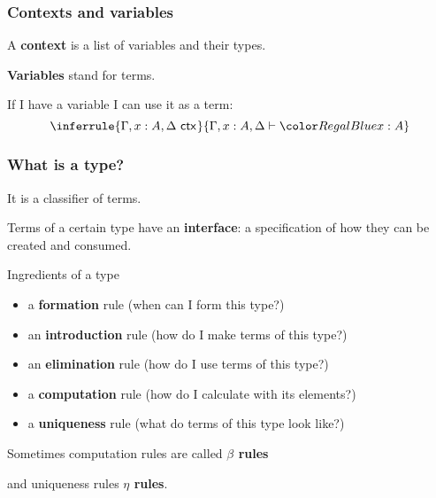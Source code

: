 \documentclass[handout]{beamer} %
\begin{document}
\begin{frame}
  \frametitle{Contexts and variables}
  A \textbf{context} is a list of variables and their types.
  
  \medskip

  \textbf{Variables} stand for terms.

  If I have a variable I can use it as a term:
  \[
    \inferrule{
      \IsCtx{\Gamma, x : A, \Delta}
    }{
      \IsTm[\Gamma, x : A, \Delta]{x}{A}
    }
  \]

\end{frame}

\begin{frame}
  \frametitle{What is a type?}
  
  It is a classifier of terms.

  \medskip
  
  Terms of a certain type have an \textbf{interface}: a specification of how
  they can be created and consumed.
  
  \medskip
  
  \begin{block}{Ingredients of a type}
    \begin{itemize}
      \item a \textbf{formation} rule (when can I form this type?)
      \item an \textbf{introduction} rule (how do I make terms of this type?)
      \item an \textbf{elimination} rule (how do I use terms of this type?)
      \item a \textbf{computation} rule (how do I calculate with its elements?)
      \item a \textbf{uniqueness} rule (what do terms of this type look like?)
    \end{itemize}
  \end{block}
  Sometimes computation rules are called \textbf{$\beta$ rules}
  
  and uniqueness rules \textbf{$\eta$ rules}.
\end{frame}
\end{document}
